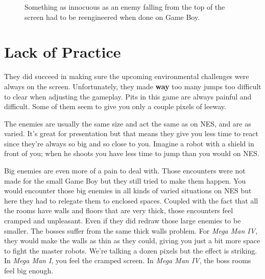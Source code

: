 \documentclass{book}
\begin{document}
\FloatBarrier\vspace{\baselineskip}\begin{figure}[H]\caption*{Something as innocuous as an enemy falling from the top of the screen had to be reengineered when done on Game Boy.}\end{figure}
\FloatBarrier\section*{Lack of Practice}
They did succeed in making sure the upcoming environmental challenges were always on the screen. Unfortunately, they made \textbf{way} too many jumps too difficult to clear when adjusting the gameplay. Pits in this game are always painful and difficult. Some of them seem to give you only a couple pixels of leeway.\par
The enemies are usually the same size and act the same as on NES, and are as varied. It’s great for presentation but that means they give you less time to react since they’re always so big and so close to you. Imagine a robot with a shield in front of you; when he shoots you have less time to jump than you would on NES.\par
\FloatBarrier\vspace{\baselineskip}\centering
\begin{minipage}{0.45\linewidth}\end{minipage}\vspace{2pt}
\begin{minipage}{0.45\linewidth}\end{minipage}
\par\justifying
Big enemies are even more of a pain to deal with. Those encounters were not made for the small Game Boy but they still tried to make them happen. You would encounter those big enemies in all kinds of varied situations on NES but here they had to relegate them to enclosed spaces. Coupled with the fact that all the rooms have walls and floors that are very thick, those encounters feel cramped and unpleasant. Even if they did redraw those large enemies to be smaller. The bosses suffer from the same thick walls problem. For \emph{Mega Man IV}, they would make the walls as thin as they could, giving you just a bit more space to fight the master robots. We’re talking a dozen pixels but the effect is striking. In \emph{Mega Man I}, you feel the cramped screen. In \emph{Mega Man IV}, the boss rooms feel big enough.\par
\end{document}
